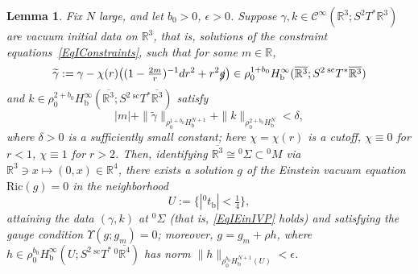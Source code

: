 \documentclass[reqno,11pt,letterpaper]{amsart}
\numberwithin{equation}{section}
\numberwithin{figure}{section}
\newtheorem{lemma}[thm]{Lemma}
\theoremstyle{definition}
\theoremstyle{remark}
\newcommand{\mc}{\mathcal}
\newcommand{\cC}{\mc C}
\newcommand{\R}{\mathbb{R}}
\newcommand{\slg}{\slashed{g}{}}
\newcommand{\Ups}{\Upsilon}
\newcommand{\eps}{\epsilon}
\newcommand{\ol}{\overline}
\newcommand{\wt}{\widetilde}
\newcommand{\bop}{{\mathrm{b}}}
\newcommand{\scl}{{\mathrm{sc}}}
\newcommand{\Tsc}{{}^{\scl}T}
\newcommand{\CI}{\cC^\infty}
\newcommand{\Hb}{H_{\bop}}
\newcommand{\Ric}{\mathrm{Ric}}
\begin{document}
\begin{lemma}
\label{LemmaPf0}
  Fix $N$ large, and let $b_0>0$, $\eps>0$. Suppose $\gamma,k\in\CI(\R^3;S^2 T^*\R^3)$ are vacuum initial data on $\R^3$, that is, solutions of the constraint equations~\eqref{EqIConstraints}, such that for some $m\in\R$,
  \begin{equation}
  \label{EqPf0GammaTilde}
    \wt\gamma := \gamma - \chi(r)\bigl((1-\tfrac{2 m}{r})^{-1}dr^2+r^2\slg\bigr) \in \rho_0^{1+b_0}\Hb^\infty(\ol{\R^3};S^2\,\Tsc^*\ol{\R^3})
  \end{equation}
  and $k\in\rho_0^{2+b_0}\Hb^\infty(\ol{\R^3};S^2\,\Tsc^*\ol{\R^3})$ satisfy
  \begin{equation}
  \label{EqPf0Small}
    |m|+\|\wt\gamma\|_{\rho_0^{1+b_0}\Hb^{N+1}}+\|k\|_{\rho_0^{2+b_0}\Hb^N}<\delta,
  \end{equation}
  where $\delta>0$ is a sufficiently small constant; here $\chi=\chi(r)$ is a cutoff, $\chi\equiv 0$ for $r<1$, $\chi\equiv 1$ for $r>2$. Then, identifying $\ol{\R^3}\cong{}^0\Sigma\subset{}^0\!M$ via $\R^3\ni x\mapsto(0,x)\in\R^4$, there exists a solution $g$ of the Einstein vacuum equation $\Ric(g)=0$ in the neighborhood
  \begin{equation}
  \label{EqPf0Nbh}
    U:=\{|{}^0 t_\bop|<\tfrac14\},
  \end{equation}
  attaining the data $(\gamma,k)$ at ${}^0\Sigma$ (that is, \eqref{EqIEinIVP} holds) and satisfying the gauge condition $\Ups(g;g_m)=0$; moreover, $g=g_m+\rho h$, where $h\in\rho_0^{b_0}\Hb^\infty(U;S^2\,\Tsc^*\,{}^0\ol{\R^4})$ has norm $\|h\|_{\rho_0^{b_0}\Hb^{N+1}(U)}<\eps$.
\end{lemma}
\end{document}
